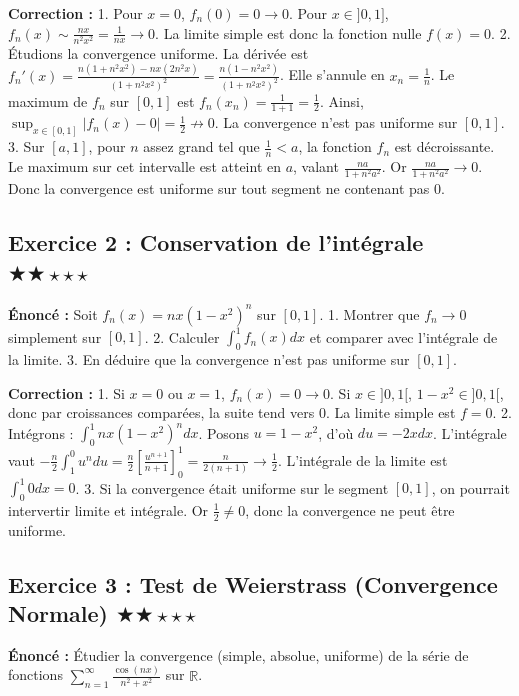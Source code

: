 \documentclass[11pt,a4paper]{article}
\begin{document}
\textbf{Correction :}
1. Pour $x = 0$, $f_n(0) = 0 \to 0$. Pour $x \in ]0, 1]$, $f_n(x) \sim \frac{nx}{n^2 x^2} = \frac{1}{nx} \to 0$. La limite simple est donc la fonction nulle $f(x) = 0$.
2. Étudions la convergence uniforme. La dérivée est $f_n'(x) = \frac{n(1 + n^2 x^2) - nx(2n^2 x)}{(1 + n^2 x^2)^2} = \frac{n(1 - n^2 x^2)}{(1 + n^2 x^2)^2}$.
Elle s'annule en $x_n = \frac{1}{n}$. Le maximum de $f_n$ sur $[0, 1]$ est $f_n(x_n) = \frac{1}{1+1} = \frac{1}{2}$.
Ainsi, $\sup_{x \in [0, 1]} |f_n(x) - 0| = \frac{1}{2} \not\to 0$. La convergence n'est pas uniforme sur $[0, 1]$.
3. Sur $[a, 1]$, pour $n$ assez grand tel que $\frac{1}{n} < a$, la fonction $f_n$ est décroissante. Le maximum sur cet intervalle est atteint en $a$, valant $\frac{na}{1 + n^2 a^2}$. Or $\frac{na}{1 + n^2 a^2} \to 0$. Donc la convergence est uniforme sur tout segment ne contenant pas 0.


\subsection*{Exercice 2 : Conservation de l'intégrale \quad $\bigstar\bigstar\star\star\star$}

\textbf{Énoncé :}
Soit $f_n(x) = n x (1-x^2)^n$ sur $[0, 1]$.
1. Montrer que $f_n \to 0$ simplement sur $[0, 1]$.
2. Calculer $\int_0^1 f_n(x) dx$ et comparer avec l'intégrale de la limite.
3. En déduire que la convergence n'est pas uniforme sur $[0, 1]$.

\textbf{Correction :}
1. Si $x=0$ ou $x=1$, $f_n(x) = 0 \to 0$. Si $x \in ]0, 1[$, $1-x^2 \in ]0, 1[$, donc par croissances comparées, la suite tend vers $0$. La limite simple est $f = 0$.
2. Intégrons : $\int_0^1 n x (1-x^2)^n dx$. Posons $u = 1-x^2$, d'où $du = -2x dx$.
L'intégrale vaut $-\frac{n}{2} \int_1^0 u^n du = \frac{n}{2} \left[ \frac{u^{n+1}}{n+1} \right]_0^1 = \frac{n}{2(n+1)} \to \frac{1}{2}$.
L'intégrale de la limite est $\int_0^1 0 dx = 0$.
3. Si la convergence était uniforme sur le segment $[0, 1]$, on pourrait intervertir limite et intégrale. Or $\frac{1}{2} \neq 0$, donc la convergence ne peut être uniforme.


\subsection*{Exercice 3 : Test de Weierstrass (Convergence Normale) \quad $\bigstar\bigstar\star\star\star$}

\textbf{Énoncé :}
Étudier la convergence (simple, absolue, uniforme) de la série de fonctions $\sum_{n=1}^\infty \frac{\cos(nx)}{n^2 + x^2}$ sur $\mathbb{R}$.
\end{document}
